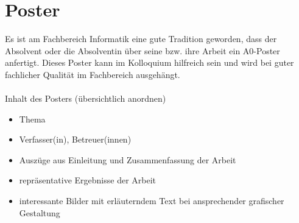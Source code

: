 \section{Poster}
Es ist am Fachbereich Informatik eine gute Tradition geworden, dass der Absolvent oder die Absolventin über seine bzw. ihre Arbeit ein A0-Poster anfertigt. Dieses Poster kann im Kolloquium hilfreich sein und wird bei guter fachlicher Qualität im Fachbereich ausgehängt. \\ \\
Inhalt des Posters (übersichtlich anordnen)

\begin{itemize}
\item Thema 
\item Verfasser(in), Betreuer(innen) 
\item Auszüge aus Einleitung und Zusammenfassung der Arbeit 
\item repräsentative Ergebnisse der Arbeit 
\item interessante Bilder mit erläuterndem Text bei ansprechender grafischer Gestaltung 

\end{itemize}
